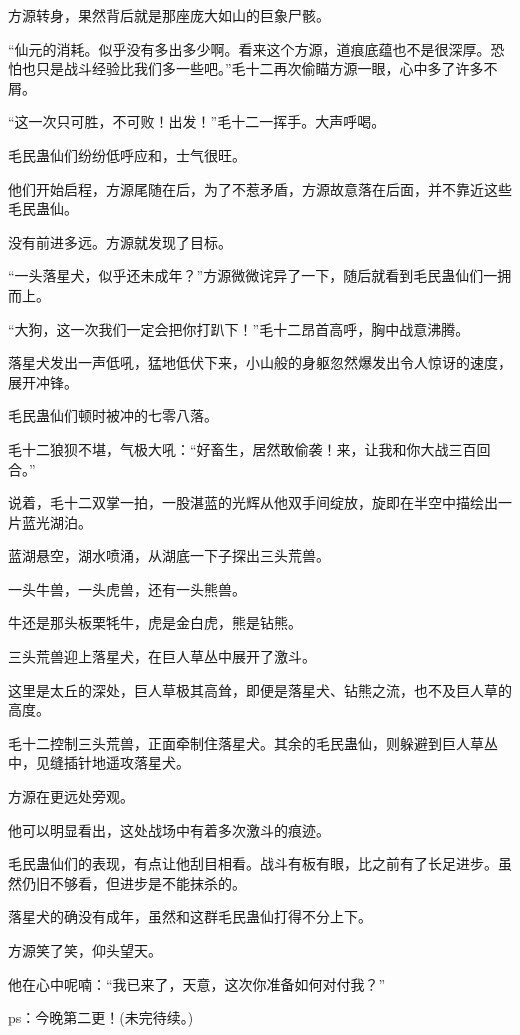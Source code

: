 \begin{this_body}
方源转身，果然背后就是那座庞大如山的巨象尸骸。

“仙元的消耗。似乎没有多出多少啊。看来这个方源，道痕底蕴也不是很深厚。恐怕也只是战斗经验比我们多一些吧。”毛十二再次偷瞄方源一眼，心中多了许多不屑。

“这一次只可胜，不可败！出发！”毛十二一挥手。大声呼喝。

毛民蛊仙们纷纷低呼应和，士气很旺。

他们开始启程，方源尾随在后，为了不惹矛盾，方源故意落在后面，并不靠近这些毛民蛊仙。

没有前进多远。方源就发现了目标。

“一头落星犬，似乎还未成年？”方源微微诧异了一下，随后就看到毛民蛊仙们一拥而上。

“大狗，这一次我们一定会把你打趴下！”毛十二昂首高呼，胸中战意沸腾。

落星犬发出一声低吼，猛地低伏下来，小山般的身躯忽然爆发出令人惊讶的速度，展开冲锋。

毛民蛊仙们顿时被冲的七零八落。

毛十二狼狈不堪，气极大吼：“好畜生，居然敢偷袭！来，让我和你大战三百回合。”

说着，毛十二双掌一拍，一股湛蓝的光辉从他双手间绽放，旋即在半空中描绘出一片蓝光湖泊。

蓝湖悬空，湖水喷涌，从湖底一下子探出三头荒兽。

一头牛兽，一头虎兽，还有一头熊兽。

牛还是那头板栗牦牛，虎是金白虎，熊是钻熊。

三头荒兽迎上落星犬，在巨人草丛中展开了激斗。

这里是太丘的深处，巨人草极其高耸，即便是落星犬、钻熊之流，也不及巨人草的高度。

毛十二控制三头荒兽，正面牵制住落星犬。其余的毛民蛊仙，则躲避到巨人草丛中，见缝插针地遥攻落星犬。

方源在更远处旁观。

他可以明显看出，这处战场中有着多次激斗的痕迹。

毛民蛊仙们的表现，有点让他刮目相看。战斗有板有眼，比之前有了长足进步。虽然仍旧不够看，但进步是不能抹杀的。

落星犬的确没有成年，虽然和这群毛民蛊仙打得不分上下。

方源笑了笑，仰头望天。

他在心中呢喃：“我已来了，天意，这次你准备如何对付我？”

ps：今晚第二更！(未完待续。)

\end{this_body}

